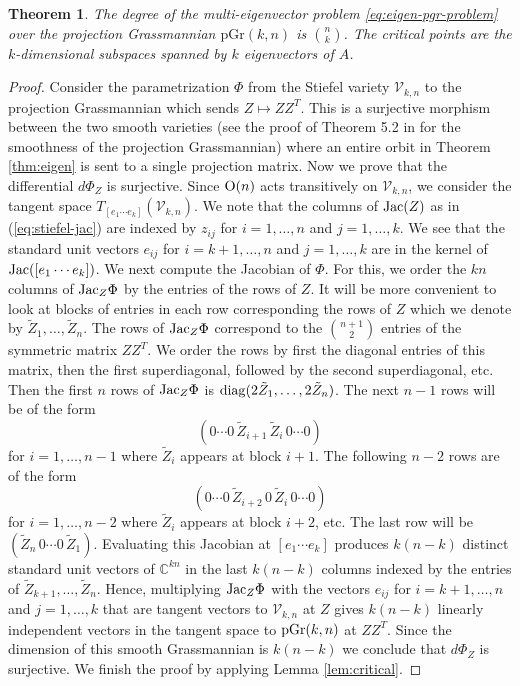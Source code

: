 \documentclass[12pt]{extarticle}
\newtheorem{theorem}{Theorem}
\theoremstyle{definition}
\numberwithin{theorem}{section}
\newcommand{\CC}{\mathbb{C}}
\begin{document}
\begin{theorem}\label{thm:eigen-pgr-degree}
    The degree of the multi-eigenvector problem \eqref{eq:eigen-pgr-problem} over the projection Grassmannian $\mathrm{pGr}(k, n)$ is $\binom{n}{k}$. 
    The critical points are the $k$-dimensional subspaces spanned by $k$ eigenvectors of $A$. 
\end{theorem}
\begin{proof}
   Consider the parametrization $\Phi$ from the Stiefel variety $\mathcal V_{k,n}$ to the projection Grassmannian which sends $Z \mapsto ZZ^T$. This is a surjective morphism between the two smooth varieties 
   (see the proof of Theorem 5.2 in \cite{DFRS} for the smoothness of the projection Grassmannian) where an entire orbit in Theorem \ref{thm:eigen} is sent to a single projection matrix.  Now we prove that the differential $d\Phi_Z$ is surjective.  Since ${\rm O}(n)$ acts transitively on $\mathcal V_{k,n}$, we consider the tangent space $T_{[e_1 \cdots e_k]}(\mathcal V_{k,n})$.
   We note that the columns of ${\rm Jac}(Z)$ as in (\ref{eq:stiefel-jac})
   are indexed by $z_{ij}$ 
   for $i=1,\ldots, n$ and $j=1, \ldots, k$. We see that the standard unit vectors $e_{ij}$ for $i=k+1, \ldots,n$ and $j=1, \ldots, k$ are in the kernel of ${\rm Jac}([e_1 \cdots e_k])$. We next compute the Jacobian of $\Phi$. For this, we order the $kn$ columns of ${\rm Jac}_Z\Phi$ by the entries of the rows of $Z$. 
   It will be more convenient to 
   look at blocks of entries in each row corresponding the rows of $Z$ which  we denote by $\tilde{Z}_1, \ldots, \tilde{Z}_n$. 
   The rows of ${\rm Jac}_Z\Phi$ correspond to the $\binom{n+1}{2}$ 
   entries of the symmetric matrix $ZZ^T$. We order the rows by first the diagonal entries of this matrix, then the first superdiagonal, followed by the second superdiagonal, etc. Then the first $n$ rows of ${\rm Jac}_Z \Phi$ is ${\rm diag}(2\tilde{Z}_1, \ldots, 2\tilde{Z}_n)$. The next $n-1$ rows will be of the form
   $$(0 \cdots 0 \, \tilde{Z}_{i+1} \, \tilde{Z}_i \, 0 \cdots 0)$$ for $i=1, \ldots, n-1$ where $\tilde{Z}_i$ appears at block $i+1$. The following $n-2$ rows are of the form
   $$(0 \cdots 0 \, \tilde{Z}_{i+2} \, 0  \, \tilde{Z}_i \, 0 \cdots 0)$$  
   for $i=1, \ldots, n-2$ where $\tilde{Z}_i$ appears at block $i+2$, etc. The last row will be 
   $(\tilde{Z}_n \, 0 \cdots 0 \, \tilde{Z}_1)$. Evaluating this Jacobian at $[e_1 \cdots e_k]$ produces $k(n-k)$ distinct standard unit vectors of $\CC^{kn}$ in the last $k(n-k)$ columns indexed by the entries 
   of $\tilde{Z}_{k+1}, \ldots, \tilde{Z}_n$. Hence, multiplying ${\rm Jac}_Z\Phi$ with the vectors $e_{ij}$ for $i=k+1, \ldots, n$ and $j=1, \ldots, k$ that are tangent vectors to $\mathcal V_{k,n}$ at $Z$
   gives $k(n-k)$ linearly independent vectors in the tangent space to ${\rm pGr}(k,n)$ at $ZZ^T$. Since the dimension of this smooth Grassmannian is $k(n-k)$ we conclude that $d\Phi_Z$ is surjective. We finish the proof by applying Lemma \ref{lem:critical}.
\end{proof}
\end{document}
